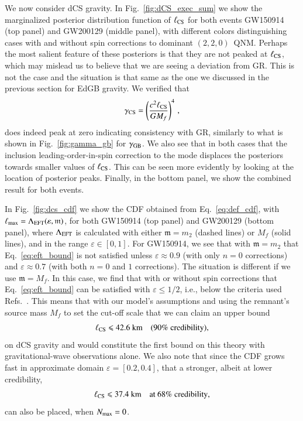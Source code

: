 \documentclass[twocolumn,
               prd,
               aps,
               superscriptaddress,
               tightenlines,
               nofootinbib,
               eqsecnum,
               amsfonts,
               amsmath,
               longbibliography]{revtex4-1}
\newcommand{\gm}{\mathfrak{m}}
\begin{document}
We now consider dCS gravity.
%
In Fig.~\ref{fig:dCS_exec_sum} we show the marginalized posterior distribution
function of $\ell_{\rm CS}$ for both events GW150914 (top panel) and GW200129
(middle panel), with different colors distinguishing cases with and without spin corrections to
dominant $(2,2,0)$~QNM.
%
Perhaps the most salient feature of these posteriors is that they are not
peaked at $\ell_{\rm CS}$, which may mislead us to believe that we are seeing a
deviation from GR. This is not the case and the situation is that same as the
one we discussed in the previous section for EdGB gravity.
%
We verified that
%
\begin{equation}
    \gamma_{\rm CS} = \left( \frac{c^2 \ell_{\rm CS}}{G M_{f}} \right)^{4}\,,
\end{equation}
%
does indeed peak at zero indicating consistency with GR, similarly to what is shown in Fig.~\ref{fig:gamma_gb} for $\gamma_{\rm GB}$.
%
We also see that in both cases that the inclusion leading-order-in-spin
correction to the mode displaces the posteriors towards smaller values of
$\ell_{\rm CS}$. This can be seen more evidently by looking at the location of
posterior peaks.
%
Finally, in the bottom panel, we show the combined result for both events.

In Fig.~\ref{fig:dcs_cdf} we show the CDF
obtained from Eq.~\eqref{eq:def_cdf}, with $\ell_{\rm max} = \Lambda_{\rm EFT} (\varepsilon, \gm)$,
for both GW150914 (top panel) and GW200129 (bottom panel), where $\Lambda_{\rm EFT}$
is calculated with either $\gm = m_2$ (dashed lines) or $M_{f}$ (solid lines),
and in the range $\varepsilon \in [0,1]$.
%
For GW150914, we see that with $\gm = m_2$ that Eq.~\eqref{eq:eft_bound} is not
satisfied unless $\varepsilon \approx 0.9$ (with only $n=0$ corrections) and
$\varepsilon \approx 0.7$ (with both $n=0$ and $1$ corrections).
%
The situation is different if we use $\gm = M_f$. In this case, we find that
with or without spin corrections that Eq.~\eqref{eq:eft_bound} can be satisfied
with $\varepsilon \leqslant 1/2$, i.e., below the criteria used
Refs.~\cite{Nair:2019iur,Perkins:2021mhb,Lyu:2022gdr}.
%
This means that with our model's assumptions and using the remnant's source mass $M_f$ to set the
cut-off scale that we can claim an upper bound
%
\begin{equation}
\ell_{\rm CS} \leqslant 42.6~\textrm{km}
\quad \textrm{(90\% credibility)},
\end{equation}
%
on dCS gravity and would constitute the first bound on this theory with
gravitational-wave observations alone.
%
We also note that since the CDF grows fast in approximate domain $\varepsilon = [0.2, 0.4]$,
that a stronger, albeit at lower credibility,
%
\begin{equation}
\ell_{\rm CS} \leqslant 37.4~\textrm{km}
\quad \textrm{at 68\% credibility},
\end{equation}
%
can also be placed, when $N_{\rm max}=0$.
\end{document}
